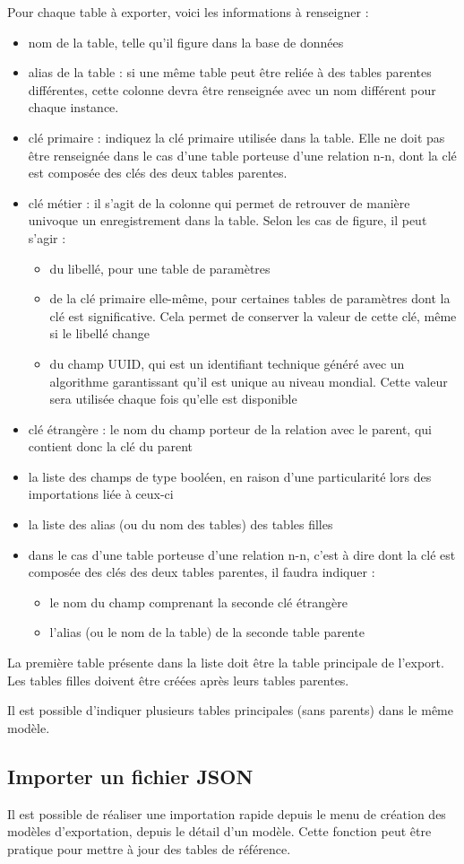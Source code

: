 Pour chaque table à exporter, voici les informations à renseigner :
\begin{itemize}
	\item nom de la table, telle qu'il figure dans la base de données
	\item alias de la table : si une même table peut être reliée à des tables parentes différentes, cette colonne devra être renseignée avec un nom différent pour chaque instance. 
	\item  clé primaire : indiquez la clé primaire utilisée dans la table. Elle ne doit pas être renseignée dans le cas d'une table porteuse d'une relation n-n, dont la clé est composée des clés des deux tables parentes.
	\item clé métier : il s'agit de la colonne qui permet de retrouver de manière univoque un enregistrement dans la table. Selon les cas de figure, il peut s'agir :
	\begin{itemize}
		\item du libellé, pour une table de paramètres
		\item de la clé primaire elle-même, pour certaines tables de paramètres dont la clé est significative. Cela permet de conserver la valeur de cette clé, même si le libellé change
		\item du champ UUID, qui est un identifiant technique généré avec un algorithme garantissant qu'il est unique au niveau mondial. Cette valeur sera utilisée chaque fois qu'elle est disponible
	\end{itemize}
	\item clé étrangère : le nom du champ porteur de la relation avec le parent, qui contient donc la clé du parent
	\item la liste des champs de type booléen, en raison d'une particularité lors des importations liée à ceux-ci
	\item la liste des alias (ou du nom des tables) des tables filles
	\item dans le cas d'une table porteuse d'une relation n-n, c'est à dire dont la clé est composée des clés des deux tables parentes, il faudra indiquer :
	\begin{itemize}
		\item le nom du champ comprenant la seconde clé étrangère
		\item l'alias (ou le nom de la table) de la seconde table parente
	\end{itemize}
\end{itemize}

La première table présente dans la liste doit être la table principale de l'export. Les tables filles doivent être créées après leurs tables parentes.

Il est possible d'indiquer plusieurs tables principales (sans parents) dans le même modèle.

\subsection{Importer un fichier JSON}

Il est possible de réaliser une importation rapide depuis le menu de création des modèles d'exportation, depuis le détail d'un modèle. Cette fonction peut être pratique pour mettre à jour des tables de référence.
